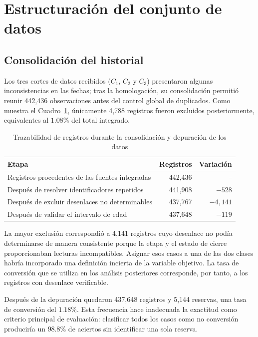 \section{Estructuración del conjunto de datos}
\label{sec:entendimiento-datos}

\subsection{Consolidación del historial}
\label{sec:res-prep}

Los tres cortes de datos recibidos ($C_1$, $C_2$ y $C_3$) presentaron algunas inconsistencias en las fechas; tras la homologación, su consolidación permitió reunir 442{,}436 observaciones antes del control global de duplicados. Como muestra el Cuadro~\ref{cuad:trazabilidad-prep}, únicamente 4{,}788 registros fueron excluidos posteriormente, equivalentes al $1.08\%$ del total integrado.


\begin{table}[H]
\centering
\caption{Trazabilidad de registros durante la consolidación y depuración de los datos}
\label{cuad:trazabilidad-prep}
\small
\begin{tabular}{lrr}
\hline
\textbf{Etapa} & \textbf{Registros} & \textbf{Variación} \\
\hline
Registros procedentes de las fuentes integradas & 442{,}436 & -- \\
Después de resolver identificadores repetidos & 441{,}908 & $-528$ \\
Después de excluir desenlaces no determinables & 437{,}767 & $-4{,}141$ \\
Después de validar el intervalo de edad & 437{,}648 & $-119$ \\
\hline
\end{tabular}
\fuentepropia
\end{table}

La mayor exclusión correspondió a 4{,}141 registros cuyo desenlace no podía determinarse de manera consistente porque la etapa y el estado de cierre proporcionaban lecturas incompatibles. Asignar esos casos a una de las dos clases habría incorporado una definición incierta de la variable objetivo. La tasa de conversión que se utiliza en los análisis posteriores corresponde, por tanto, a los registros con desenlace verificable.

Después de la depuración quedaron 437{,}648 registros y 5{,}144 reservas, una tasa de conversión del $1.18\%$. Esta frecuencia hace inadecuada la exactitud como criterio principal de evaluación: clasificar todos los casos como no conversión produciría un $98.8\%$ de aciertos sin identificar una sola reserva.

